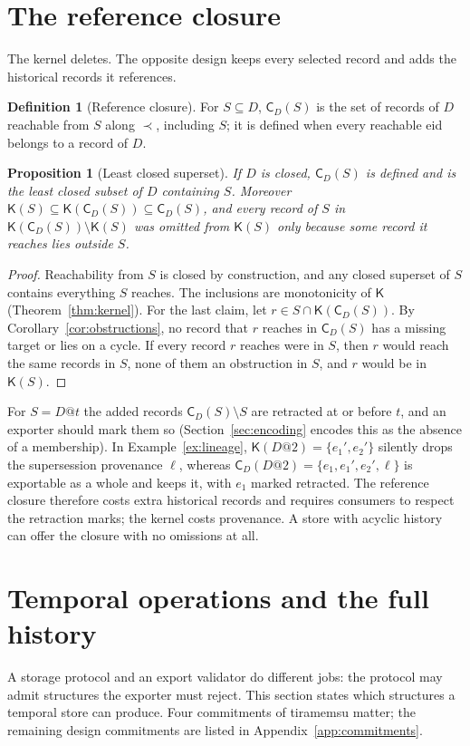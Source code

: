 \documentclass[11pt]{article}
\theoremstyle{plain}
\newtheorem{proposition}[theorem]{Proposition}
\theoremstyle{definition}
\newtheorem{definition}{Definition}
\theoremstyle{remark}
\newcommand{\refs}{\prec}
\newcommand{\Kernel}{\mathsf{K}}
\newcommand{\Close}{\mathsf{C}}
\begin{document}
\section{The reference closure}\label{sec:dual}
The kernel deletes. The opposite design keeps every selected record and adds the
historical records it references.

\begin{definition}[Reference closure]
For $S\subseteq D$, $\Close_D(S)$ is the set of records of $D$ reachable from $S$
along $\refs$, including $S$; it is defined when every reachable eid belongs to a
record of $D$.
\end{definition}

\begin{proposition}[Least closed superset]\label{prop:dual}
If $D$ is closed, $\Close_D(S)$ is defined and is the least closed subset of $D$
containing $S$. Moreover
$\Kernel(S)\subseteq\Kernel(\Close_D(S))\subseteq\Close_D(S)$, and every record of
$S$ in $\Kernel(\Close_D(S))\setminus\Kernel(S)$ was omitted from $\Kernel(S)$ only
because some record it reaches lies outside $S$.
\end{proposition}
\begin{proof}
Reachability from $S$ is closed by construction, and any closed superset of $S$
contains everything $S$ reaches. The inclusions are monotonicity of $\Kernel$
(Theorem~\ref{thm:kernel}). For the last claim, let $r\in S\cap\Kernel(\Close_D(S))$. By
Corollary~\ref{cor:obstructions}, no record that $r$ reaches in $\Close_D(S)$ has a
missing target or lies on a cycle. If every record $r$ reaches were in $S$, then $r$
would reach the same records in $S$, none of them an obstruction in $S$, and $r$
would be in $\Kernel(S)$.
\end{proof}

For $S=D@t$ the added records $\Close_D(S)\setminus S$ are retracted at or before
$t$, and an exporter should mark them so (Section~\ref{sec:encoding} encodes this
as the absence of a membership). In Example~\ref{ex:lineage},
$\Kernel(D@2)=\{e_1',e_2'\}$ silently drops the supersession provenance $\ell$,
whereas $\Close_D(D@2)=\{e_1,e_1',e_2',\ell\}$ is exportable as a whole and keeps
it, with $e_1$ marked retracted. The reference closure therefore costs extra
historical records and requires consumers to respect the retraction marks; the
kernel costs provenance. A store with acyclic history can offer the closure with no
omissions at all.

\section{Temporal operations and the full history}\label{sec:history}
A storage protocol and an export validator do different jobs: the protocol may
admit structures the exporter must reject. This section states which structures a
temporal store can produce. Four commitments of tiramemsu matter; the remaining
design commitments are listed in Appendix~\ref{app:commitments}.
\end{document}
